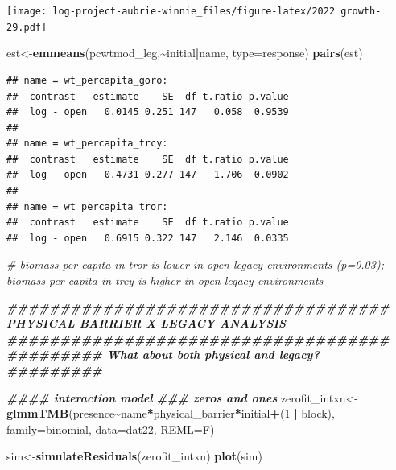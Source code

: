 \documentclass[
]{article}
\newenvironment{Shaded}{\begin{snugshade}}{\end{snugshade}}
\newcommand{\AttributeTok}[1]{\textcolor[rgb]{0.13,0.29,0.53}{#1}}
\newcommand{\CommentTok}[1]{\textcolor[rgb]{0.56,0.35,0.01}{\textit{#1}}}
\newcommand{\DecValTok}[1]{\textcolor[rgb]{0.00,0.00,0.81}{#1}}
\newcommand{\DocumentationTok}[1]{\textcolor[rgb]{0.56,0.35,0.01}{\textbf{\textit{#1}}}}
\newcommand{\FunctionTok}[1]{\textcolor[rgb]{0.13,0.29,0.53}{\textbf{#1}}}
\newcommand{\NormalTok}[1]{#1}
\newcommand{\OtherTok}[1]{\textcolor[rgb]{0.56,0.35,0.01}{#1}}
\newcommand{\SpecialCharTok}[1]{\textcolor[rgb]{0.81,0.36,0.00}{\textbf{#1}}}
\newcommand{\StringTok}[1]{\textcolor[rgb]{0.31,0.60,0.02}{#1}}
\begin{document}
\texttt{[image: log-project-aubrie-winnie\_files/figure-latex/2022 growth-29.pdf]}

\begin{Shaded}
\begin{Highlighting}[]
\NormalTok{est}\OtherTok{\textless{}{-}}\FunctionTok{emmeans}\NormalTok{(pcwtmod\_leg,}\SpecialCharTok{\textasciitilde{}}\NormalTok{initial}\SpecialCharTok{|}\NormalTok{name, }\AttributeTok{type=}\StringTok{\textquotesingle{}response\textquotesingle{}}\NormalTok{)}
\FunctionTok{pairs}\NormalTok{(est)}
\end{Highlighting}
\end{Shaded}

\begin{verbatim}
## name = wt_percapita_goro:
##  contrast   estimate    SE  df t.ratio p.value
##  log - open   0.0145 0.251 147   0.058  0.9539
## 
## name = wt_percapita_trcy:
##  contrast   estimate    SE  df t.ratio p.value
##  log - open  -0.4731 0.277 147  -1.706  0.0902
## 
## name = wt_percapita_tror:
##  contrast   estimate    SE  df t.ratio p.value
##  log - open   0.6915 0.322 147   2.146  0.0335
\end{verbatim}

\begin{Shaded}
\begin{Highlighting}[]
\CommentTok{\# biomass per capita in tror is lower in open legacy environments (p=0.03); biomass per capita in trcy is higher in open legacy environments}

\DocumentationTok{\#\#\#\#\#\#\#\#\#\#\#\#\#\#\#\#\#\#\#\#\#\#\#\#\#\#\#\#\#\#\#\#\#\#\#\# PHYSICAL BARRIER X LEGACY ANALYSIS \#\#\#\#\#\#\#\#\#\#\#\#\#\#\#\#\#\#\#\#\#\#\#\#\#\#\#\#\#\#\#\#\#\#\#\#}
\DocumentationTok{\#\#\#\#\#\#\#\#\# What about both physical and legacy? \#\#\#\#\#\#\#\#\# }

\DocumentationTok{\#\#\#\# interaction model}
\DocumentationTok{\#\#\# zeros and ones }
\NormalTok{zerofit\_intxn}\OtherTok{\textless{}{-}}\FunctionTok{glmmTMB}\NormalTok{(presence}\SpecialCharTok{\textasciitilde{}}\NormalTok{name}\SpecialCharTok{*}\NormalTok{physical\_barrier}\SpecialCharTok{*}\NormalTok{initial}\SpecialCharTok{+}\NormalTok{(}\DecValTok{1} \SpecialCharTok{|}\NormalTok{ block), }\AttributeTok{family=}\NormalTok{binomial, }\AttributeTok{data=}\NormalTok{dat22, }\AttributeTok{REML=}\NormalTok{F)}

\NormalTok{sim}\OtherTok{\textless{}{-}}\FunctionTok{simulateResiduals}\NormalTok{(zerofit\_intxn)}
\FunctionTok{plot}\NormalTok{(sim)}
\end{Highlighting}
\end{Shaded}
\end{document}
